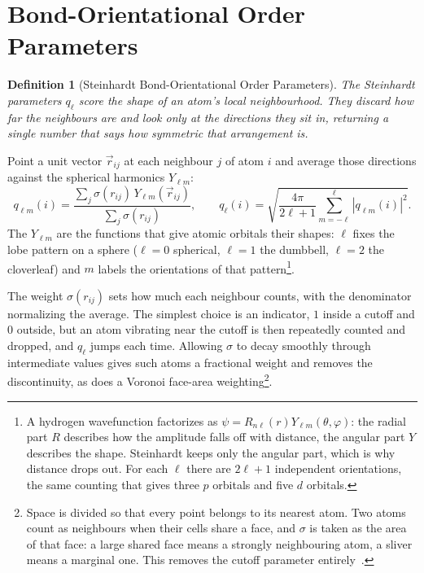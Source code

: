 \documentclass{article}
\newtheorem{definition}{Definition}
\begin{document}
\section{Bond-Orientational Order Parameters}
\label{BOO}
\begin{definition}[Steinhardt Bond-Orientational Order Parameters]
    The Steinhardt parameters $q_\ell$ score the shape of an atom's local neighbourhood. They discard how far the neighbours are and look only at the directions they sit in, returning a single number that says how symmetric that arrangement is.
\end{definition}

Point a unit vector $\vec{r}_{ij}$ at each neighbour $j$ of atom $i$ and average those directions against the spherical harmonics $Y_{\ell m}$:
\begin{equation}
    q_{\ell m}(i) = \frac{\sum_{j}\sigma(r_{ij})\,Y_{\ell m}(\vec{r}_{ij})}{\sum_{j}\sigma(r_{ij})},
    \qquad
    q_{\ell}(i) = \sqrt{ \frac{4\pi}{2\ell + 1} \sum_{m = -\ell}^{\ell} \left| q_{\ell m}(i) \right|^{2} }.
    \label{eq:steinhardt}
\end{equation}
The $Y_{\ell m}$ are the functions that give atomic orbitals their shapes: $\ell$ fixes the lobe pattern on a sphere ($\ell = 0$ spherical, $\ell = 1$ the dumbbell, $\ell = 2$ the cloverleaf) and $m$ labels the orientations of that pattern\footnote{A hydrogen wavefunction factorizes as $\psi = R_{n\ell}(r)Y_{\ell m}(\theta,\varphi)$: the radial part $R$ describes how the amplitude falls off with distance, the angular part $Y$ describes the shape. Steinhardt keeps only the angular part, which is why distance drops out. For each $\ell$ there are $2\ell+1$ independent orientations, the same counting that gives three $p$ orbitals and five $d$ orbitals.}.

The weight $\sigma(r_{ij})$ sets how much each neighbour counts, with the denominator normalizing the average. The simplest choice is an indicator, $1$ inside a cutoff and $0$ outside, but an atom vibrating near the cutoff is then repeatedly counted and dropped, and $q_\ell$ jumps each time. Allowing $\sigma$ to decay smoothly through intermediate values gives such atoms a fractional weight and removes the discontinuity, as does a Voronoi face-area weighting\footnote{Space is divided so that every point belongs to its nearest atom. Two atoms count as neighbours when their cells share a face, and $\sigma$ is taken as the area of that face: a large shared face means a strongly neighbouring atom, a sliver means a marginal one. This removes the cutoff parameter entirely~\cite{mickel2013}.}.
\end{document}
